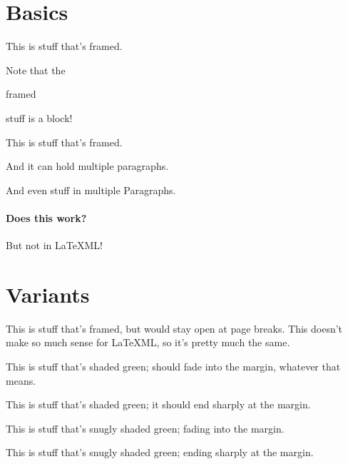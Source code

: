 \documentclass{article}
\begin{document}
\section{Basics}

\begin{framed}
This is stuff that's framed.
\end{framed}

Note that the \begin{framed}framed\end{framed} stuff is a block!

\begin{framed}
This is stuff that's framed.

And it can hold multiple paragraphs.
\end{framed}

\begin{framed}
And even stuff in multiple Paragraphs.

\paragraph{Does this work?} But not in LaTeXML!
\end{framed}

\section{Variants}
\begin{oframed}
This is stuff that's framed, but would stay open at page breaks.
This doesn't make so much sense for LaTeXML, so it's pretty much
the same.
\end{oframed}

\begin{shaded}
This is stuff that's shaded green;
should fade into the margin, whatever that means.
\end{shaded}

\begin{shaded*}
This is stuff that's shaded green;
it should end sharply at the margin.
\end{shaded*}

\begin{snugshade}
This is stuff that's snugly shaded green;
fading into the margin.
\end{snugshade}

\begin{snugshade*}
This is stuff that's snugly shaded green;
ending sharply at the margin.
\end{snugshade*}
\end{document}
